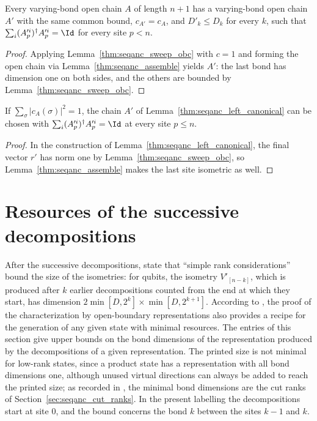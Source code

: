 \begin{lemma}
    \label{thm:seqanc_left_canonical}
    \leanok
    Every varying-bond open chain $A$ of length $n+1$ has a varying-bond
    open chain $A'$ with the same common bound, $c_{A'}=c_A$, and
    $D'_k\le D_k$ for every $k$, such that
    $\sum_i(A'^i_p)^\dagger A'^i_p=\Id$ for every site $p<n$.
\end{lemma}
\begin{proof}
    \leanok
    Applying Lemma~\ref{thm:seqanc_sweep_obc} with $c=1$ and forming the open chain via
    Lemma~\ref{thm:seqanc_assemble} yields $A'$: the last bond has
    dimension one on both sides, and the others are bounded by
    Lemma~\ref{thm:seqanc_sweep_obc}.
\end{proof}

\begin{lemma}
    \label{thm:seqanc_left_canonical_norm}
    \leanok
    If $\sum_\sigma|c_A(\sigma)|^2=1$, the chain $A'$ of
    Lemma~\ref{thm:seqanc_left_canonical} can be chosen with
    $\sum_i(A'^i_p)^\dagger A'^i_p=\Id$ at every site $p\le n$.
\end{lemma}
\begin{proof}
    \leanok
    In the construction of Lemma~\ref{thm:seqanc_left_canonical}, the
    final vector $r'$ has norm one by Lemma~\ref{thm:seqanc_sweep_obc}, so
    Lemma~\ref{thm:seqanc_assemble} makes the last site isometric as well.
\end{proof}

\section{Resources of the successive decompositions}

After the successive decompositions, \cite{Schoen2005Sequential} state that
``simple rank considerations'' bound the size of the isometries: for
qubits, the isometry $V'_{[n-k]}$, which is produced after $k$ earlier
decompositions counted from the end at which they start, has dimension
$2\min[D,2^k]\times\min[D,2^{k+1}]$. According to \cite[Section~5.1]{PerezGarcia2007Matrix},
the proof of the characterization by open-boundary representations also
provides a recipe for the generation of any given state with minimal resources.
The entries of this section give upper bounds on the bond dimensions of the
representation produced by the decompositions of a given representation. The
printed size is not minimal for low-rank states, since a product state has a
representation with all bond dimensions one, although unused virtual
directions can always be added to reach the printed size; as recorded in
\cite{gap:ssvcw05_sequential_bond_upper_bound_scope}, the minimal
bond dimensions are the cut ranks of Section~\ref{sec:seqanc_cut_ranks}. In the present labelling
the decompositions start at site $0$, and the bound concerns the bond $k$
between the sites $k-1$ and $k$.

